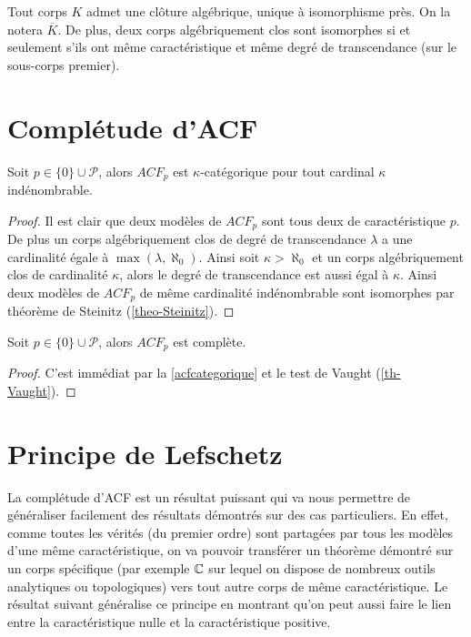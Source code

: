 \begin{theo}\label{theo-Steinitz}
Tout corps $K$ admet une clôture algébrique, unique à isomorphisme près. On la notera $\overline{K}$.
De plus, deux corps algébriquement clos sont isomorphes si et seulement s'ils ont même caractéristique et même degré de transcendance (sur le sous-corps premier).
\end{theo}


\section{Complétude d'ACF}

\begin{prop}\label{acfcategorique}
Soit $p \in \{0\} \cup \mathcal{P}$, alors $ACF_p$ est $\kappa$-catégorique pour tout cardinal $\kappa$ indénombrable.
\end{prop}

\begin{proof}
Il est clair que deux modèles de $ACF_p$ sont tous deux de caractéristique $p$. De plus un corps algébriquement clos de degré de transcendance $\lambda$ a
une cardinalité égale à $\max(\lambda, \aleph_0)$. Ainsi soit $\kappa > \aleph_0$ et un corps algébriquement clos de cardinalité $\kappa$, alors le 
degré de transcendance est aussi égal à $\kappa$. Ainsi deux modèles de $ACF_p$
de même cardinalité indénombrable sont isomorphes par théorème de Steinitz
(\cref{theo-Steinitz}).
\end{proof}

\begin{prop} \label{prop-acf-complet}
Soit $p \in \{0\} \cup \mathcal{P}$, alors $ACF_p$ est complète.
\end{prop}

\begin{proof}
C'est immédiat par la \cref{acfcategorique} et le test de Vaught (\cref{th-Vaught}).
\end{proof}

\section{Principe de Lefschetz}

La complétude d'ACF est un résultat puissant qui va nous permettre de
généraliser facilement des résultats démontrés sur des cas particuliers. En
effet, comme toutes les vérités (du premier ordre) sont partagées par tous les
modèles d'une même caractéristique, on va pouvoir transférer un théorème
démontré sur un corps spécifique (par exemple $\mathbb{C}$ sur lequel on dispose de
nombreux outils analytiques ou topologiques) vers tout autre corps de même caractéristique.
Le résultat suivant généralise ce principe en montrant qu'on peut aussi faire le
lien entre la caractéristique nulle et la caractéristique positive.

